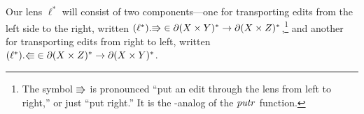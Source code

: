 Our lens $\ell^*$ will consist of two components---one for transporting edits
from the left side to the right, written $(\ell^*).\mathord{\Rrightarrow} \in \partial(X
\times Y)^* \to \partial(X \times Z)^*$,\footnote{The symbol $\mathord{\Rrightarrow}$ is
  pronounced ``put an edit through the lens from left to right,'' or just
  ``put right.''  It is the {\edit}-analog of the $\mathit{putr}$ function.} and another for transporting
edits from right to left, written $(\ell^*).\mathord{\Lleftarrow} \in \partial(X \times
Z)^* \to \partial(X \times Y)^*$.
%



